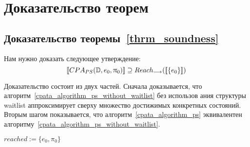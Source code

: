 \chapter{Доказательство теорем} \label{AppendixA}

\section{Доказательство теоремы~\ref{thrm_soundness}}
\label{sect_thrm_soundness_proof}

Нам нужно доказать следующее утверждение:
$$[\![ CPA_{PS}(\mathbb{D}, e_0, \uppi_0) ]\!] \supseteq Reach_{\longrightarrow}([\![ \{e_0\} ]\!])$$

Доказательство состоит из двух частей. Сначала доказывается, что алгоритм~\ref{cpata_algorithm_ps_without_waitlist} без использов
ания структуры waitlist аппроксимирует сверху множество достижимых конкретных состояний. Вторым шагом показывается, что алгоритм~\ref{cpata_algorithm_ps} эквивалентен алгоритму~\ref{cpata_algorithm_ps_without_waitlist}.

\begin{algorithm}[H]
 $reached := \{e_0,\pi_0\} $\;
 

 \caption{$\overline{CPA}(\mathbb{D}, e_0, \pi_0)$}
 \label{cpata_algorithm_ps_without_waitlist}
\end{algorithm}

